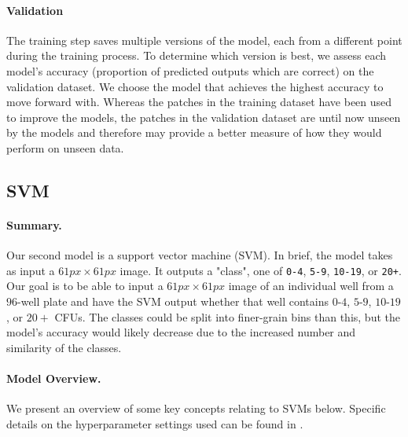 \documentclass[10pt,letterpaper]{article}
\begin{document}
    \paragraph*{Validation}
        The training step saves multiple versions of the model, each from a different point during the training process. To determine which version is best, we assess each model's accuracy (proportion of predicted outputs which are correct) on the validation dataset. We choose the model that achieves the highest accuracy to move forward with. Whereas the patches in the training dataset have been used to improve the models, the patches in the validation dataset are until now unseen by the models and therefore may provide a better measure of how they would perform on unseen data.

 

  \subsection*{SVM} \label{ssec:svm}
        \paragraph*{Summary.}
            Our second model is a support vector machine (SVM). In brief, the model takes as input a $61px \times 61px$ image. It outputs a "class", one of \texttt{0-4}, \texttt{5-9}, \texttt{10-19}, or \texttt{20+}. Our goal is to be able to input a $61px \times 61px$ image of an individual well from a $96$-well plate and have the SVM output whether that well contains $0$-$4$, $5$-$9$, $10$-$19$, or $20+$ CFUs. The classes could be split into finer-grain bins than this, but the model's accuracy would likely decrease due to the increased number and similarity of the classes.
        
        \paragraph*{Model Overview.}
            We present an overview of some key concepts relating to SVMs below. Specific details on the hyperparameter settings used can be found in .
            
\end{document}
